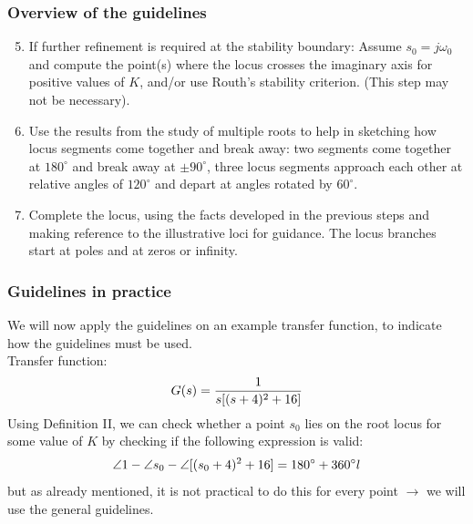 \begin{frame}
\frametitle{Overview of the guidelines}
	\begin{enumerate}
	\setcounter{enumi}{4}
	\item If further refinement is required at the stability boundary: Assume $s_0 = j\omega_0$ and compute the point(s) where the locus crosses the imaginary axis for positive values of $K$, and/or use Routh's stability criterion. (This step may not be necessary).
	\item Use the results from the study of multiple roots to help in sketching how locus segments come together and break away: two segments come together at $180^{\circ}$ and break away at $\pm 90^{\circ}$, three locus segments approach each other at relative angles of $120^{\circ}$ and depart at angles rotated by $60^{\circ}$.
	\item Complete the locus, using the facts developed in the previous steps and making reference to the illustrative loci for guidance. The locus branches start at poles and at zeros or infinity.
	\end{enumerate}
\end{frame}

\begin{frame}
\frametitle{Guidelines in practice}
	\begin{block}{ }
		We will now apply the guidelines on an example transfer function, to indicate how the guidelines must be used.\\
		\vspace{0.5em}
		Transfer function:
		\vspace{-0.5em}
		\begin{equation}
		G(s) = \frac{1}{s[(s+4)^{2} + 16]}
		\vspace{-0.5em}
		\end{equation}
		Using Definition II, we can check whether a point $s_0$ lies on the root locus for some value of $K$ by checking if the following expression is valid: 
		\vspace{-0.5em}
		\begin{equation}
		\angle 1 - \angle s_0 -\angle [(s_0 + 4)^2 + 16] = 180^{\circ} + 360^{\circ}l
		\vspace{-0.5em}
		\end{equation}
		but as already mentioned, it is not practical to do this for every point $\rightarrow$ we will use the general guidelines. 
	\end{block}
\end{frame}	

